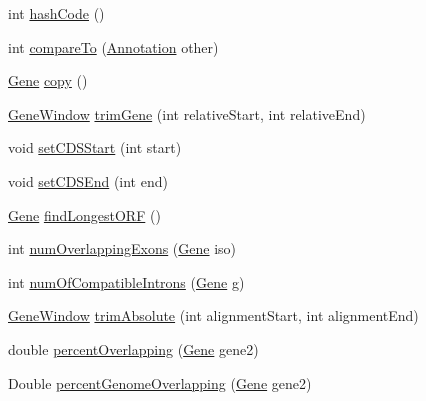 \begin{DoxyCompactItemize}
\item 
int \hyperlink{classumms_1_1core_1_1annotation_1_1_gene_a5a9828a8318aef239bc4dc0063425370}{hash\+Code} ()
\item 
int \hyperlink{classumms_1_1core_1_1annotation_1_1_gene_a3cd085a5501a376bdd6f929a7d1271b3}{compare\+To} (\hyperlink{interfaceumms_1_1core_1_1annotation_1_1_annotation}{Annotation} other)
\item 
\hyperlink{classumms_1_1core_1_1annotation_1_1_gene}{Gene} \hyperlink{classumms_1_1core_1_1annotation_1_1_gene_a682fa39fb20128063873191be423331d}{copy} ()
\item 
\hyperlink{classumms_1_1core_1_1feature_1_1_gene_window}{Gene\+Window} \hyperlink{classumms_1_1core_1_1annotation_1_1_gene_a62882d8e8ee6976eb8d41f3ae4c3b269}{trim\+Gene} (int relative\+Start, int relative\+End)
\item 
void \hyperlink{classumms_1_1core_1_1annotation_1_1_gene_ac5b1e71d199dd1f004d600b51267c2b9}{set\+C\+D\+S\+Start} (int start)
\item 
void \hyperlink{classumms_1_1core_1_1annotation_1_1_gene_a5c135a41f2cf869c6b0ee9efcc4f6c5a}{set\+C\+D\+S\+End} (int end)
\item 
\hyperlink{classumms_1_1core_1_1annotation_1_1_gene}{Gene} \hyperlink{classumms_1_1core_1_1annotation_1_1_gene_a7dd93cc2efc0a68674a9e88f3e6d9ac9}{find\+Longest\+O\+R\+F} ()
\item 
int \hyperlink{classumms_1_1core_1_1annotation_1_1_gene_acf0b3ac17707c018c54c5943f3dc8d4a}{num\+Overlapping\+Exons} (\hyperlink{classumms_1_1core_1_1annotation_1_1_gene}{Gene} iso)
\item 
int \hyperlink{classumms_1_1core_1_1annotation_1_1_gene_ad2fd628b72ef54c9ee1fbffca6488326}{num\+Of\+Compatible\+Introns} (\hyperlink{classumms_1_1core_1_1annotation_1_1_gene}{Gene} g)
\item 
\hyperlink{classumms_1_1core_1_1feature_1_1_gene_window}{Gene\+Window} \hyperlink{classumms_1_1core_1_1annotation_1_1_gene_a9c0ff8d65eb3523cb9d9d94b36d79638}{trim\+Absolute} (int alignment\+Start, int alignment\+End)
\item 
double \hyperlink{classumms_1_1core_1_1annotation_1_1_gene_a86eb52fc8956125ad9cc466e74a61717}{percent\+Overlapping} (\hyperlink{classumms_1_1core_1_1annotation_1_1_gene}{Gene} gene2)
\item 
Double \hyperlink{classumms_1_1core_1_1annotation_1_1_gene_aeb6dedb921f4a8a4f922a262d77bf8a4}{percent\+Genome\+Overlapping} (\hyperlink{classumms_1_1core_1_1annotation_1_1_gene}{Gene} gene2)
\item 

\end{DoxyCompactItemize}
